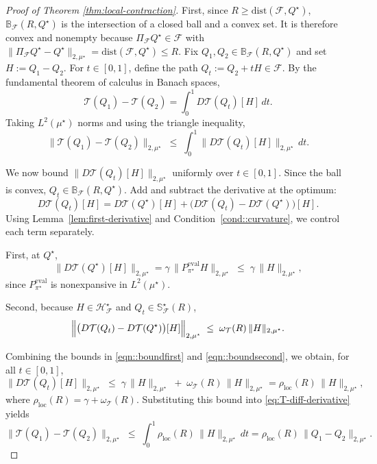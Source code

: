 \documentclass{article}
\theoremstyle{plain}
\theoremstyle{definition}
\theoremstyle{remark}
\begin{document}
\begin{proof}[Proof of Theorem \ref{thm:local-contraction}]
First, since \(R \ge \mathrm{dist}(\mathcal F, Q^\star)\),
\(\mathbb{B}_{\mathcal{F}}(R,Q^\star)\) is the intersection of a closed ball
and a convex set. It is therefore convex and nonempty because
$\Pi_{\mathcal F}Q^\star \in \mathcal F$ with
$\|\Pi_{\mathcal F}Q^\star - Q^\star\|_{2,\mu^\star}
= \mathrm{dist}(\mathcal F, Q^\star) \le R$. Fix
\(Q_1,Q_2\in \mathbb B_{\mathcal F}(R,Q^\star)\) and set
\(H:=Q_1-Q_2\). For
$t \in [0,1]$, define the path $Q_t := Q_2 + tH \in \mathcal{F}$. By the
fundamental theorem of calculus in Banach spaces,
\[
\mathcal{T}(Q_1) - \mathcal{T}(Q_2)
=
\int_0^1 D\mathcal{T}(Q_t)[H]\,dt.
\]
Taking $L^2(\mu^\star)$ norms and using the triangle inequality,
\begin{equation}
\label{eq:T-diff-derivative}
\|\mathcal T(Q_1)-\mathcal T(Q_2)\|_{2,\mu^\star}
\;\le\;
\int_0^1
\|D\mathcal T(Q_t)[H]\|_{2,\mu^\star}\,dt.
\end{equation}

We now bound \(\|D\mathcal T(Q_t)[H]\|_{2,\mu^\star}\) uniformly over
\(t\in[0,1]\). Since the ball is convex, \(Q_t\in
\mathbb B_{\mathcal F}(R,Q^\star)\). Add and subtract the derivative at the
optimum:
\[
D\mathcal T(Q_t)[H]
=
D\mathcal T(Q^\star)[H]
+
\bigl(D\mathcal T(Q_t)-D\mathcal T(Q^\star)\bigr)[H].
\]
Using Lemma~\ref{lem:first-derivative} and
Condition~\ref{cond::curvature}, we control each term separately.

First, at $Q^\star$,
\begin{equation}
\label{eqn::boundfirst}
\|D\mathcal T(Q^\star)[H]\|_{2,\mu^\star}
=
\gamma\,\|P^{\mathrm{eval}}_{\pi^\star} H\|_{2,\mu^\star}
\;\le\;
\gamma\,\|H\|_{2,\mu^\star},
\end{equation}
since $P^{\mathrm{eval}}_{\pi^\star}$ is nonexpansive in $L^2(\mu^\star)$.

Second, because \(H\in\mathcal H_{\mathcal F}^\star\) and
\(Q_t\in\mathbb S_{\mathcal F}^\star(R)\),
\begin{equation}
\label{eqn::boundsecond}
\Bigl\|
\bigl(D\mathcal T(Q_t)-D\mathcal T(Q^\star)\bigr)[H]
\Bigr\|_{2,\mu^\star}
\;\le\;
\omega_{\mathcal T}(R)\,\|H\|_{2,\mu^\star}.
\end{equation}


Combining the bounds in \eqref{eqn::boundfirst} and \eqref{eqn::boundsecond},
we obtain, for all $t \in [0,1]$,
\[
\|D\mathcal T(Q_t)[H]\|_{2,\mu^\star}
\;\le\;
\gamma\,\|H\|_{2,\mu^\star}
\;+\;
\omega_{\mathcal T}(R)\,\|H\|_{2,\mu^\star}
=
\rho_{\mathrm{loc}}(R)\,\|H\|_{2,\mu^\star},
\]
where \(\rho_{\mathrm{loc}}(R)=\gamma+\omega_{\mathcal T}(R)\). Substituting this bound into
\eqref{eq:T-diff-derivative} yields
\[
\|\mathcal T(Q_1)-\mathcal T(Q_2)\|_{2,\mu^\star}
\;\le\;
\int_0^1 \rho_{\mathrm{loc}}(R)\,\|H\|_{2,\mu^\star}\,dt
=
\rho_{\mathrm{loc}}(R)\,\|Q_1 - Q_2\|_{2,\mu^\star}.
\]


\end{proof}
\end{document}
